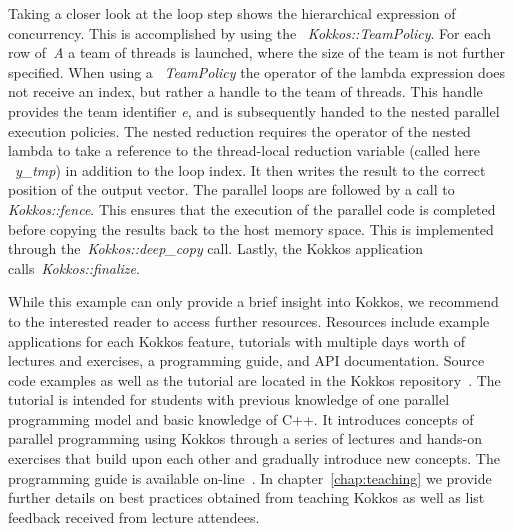 Taking a closer look at the loop step shows the hierarchical expression of concurrency. This is accomplished by using the ~\emph{Kokkos::TeamPolicy}. For each row of~\emph{A} a team of threads is launched, where the size of the team is not further specified. When using a ~\emph{TeamPolicy} the operator of the lambda expression does not receive an index, but rather a handle to the team of threads. 
This handle provides the team identifier \emph{e}, and is subsequently handed to the nested parallel execution policies. The nested reduction requires the operator of the nested lambda to take a reference to the thread-local reduction variable (called here ~\emph{y\_tmp}) in addition to the loop index. It then writes the result to the correct position of the output vector. 
The parallel loops are followed by a call to \emph{Kokkos::fence}. This ensures that the execution of the parallel code is completed before copying the results back to the host memory space. This is implemented through the~\emph{Kokkos::deep\_copy} call. Lastly, the Kokkos application calls~\emph{Kokkos::finalize}.

While this example can only provide a brief insight into Kokkos, we recommend to the interested reader to access further resources. Resources include example applications for each Kokkos feature, tutorials with multiple days worth of lectures and exercises, a programming guide, and API documentation. Source code examples as well as the tutorial are located in the Kokkos repository~\cite{KOKKOS_REPO}. The tutorial is intended for students with previous knowledge of one parallel programming model and basic knowledge of C++. It introduces concepts of parallel programming using Kokkos through a series of lectures and hands-on exercises that build upon each other and gradually introduce new concepts. The programming guide is available on-line~\cite{KOKKOS_WIKI}. In chapter~\ref{chap:teaching} we provide further details on best practices obtained from teaching Kokkos as well as list feedback received from lecture attendees.

